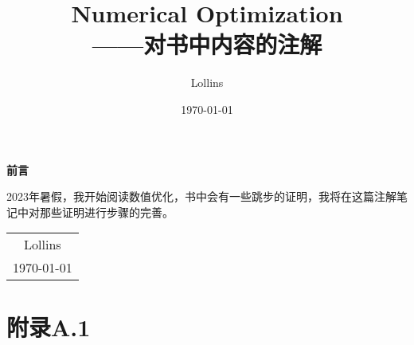 \documentclass[12pt, a4paper, oneside]{ctexbook}
\begin{document}
\title{{\Huge{\textbf{Numerical Optimization}}\\——对书中内容的注解}}
\author{Lollins}
\date{\today}

\maketitle

\setcounter{page}{1}

\begin{center}
    \Huge\textbf{前言}
\end{center}
\par
2023年暑假，我开始阅读数值优化，书中会有一些跳步的证明，我将在这篇注解笔记中对那些证明进行步骤的完善。

\begin{flushright}
    \begin{tabular}{c}
        Lollins \\
        \today
    \end{tabular}
\end{flushright}

\newpage
{}
\setcounter{page}{1}
\tableofcontents
\newpage
\setcounter{page}{1}

\chapter{附录A.1}
\end{document}
